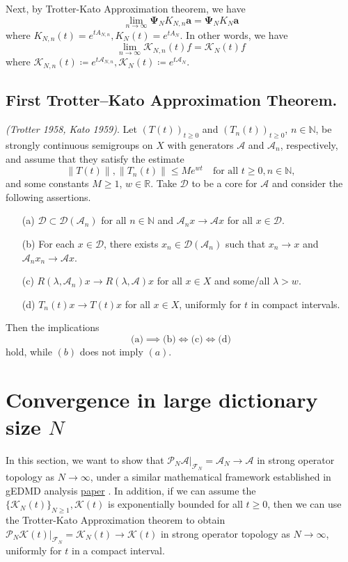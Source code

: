 \documentclass{article}[11]
\begin{document}
Next, by Trotter-Kato Approximation theorem, we have 
$$\lim_{n\to\infty} \mathbf{\Psi}_N K_{N,n} \mathbf{a} = \mathbf{\Psi}_N K_N \mathbf{a}$$ 
where $K_{N,n}(t) = e^{t A_{N,n}}, K_{N}(t) = e^{t A_N}$. In other words, we have
$$
\lim_{n\to\infty}\mathcal{K}_{N,n}(t) f = \mathcal{K}_{N}(t) f
$$ where $\mathcal{K}_{N,n}(t)\coloneqq e^{t \mathcal{A}_{N,n}}, \mathcal{K}_{N}(t)\coloneqq e^{t \mathcal{A}_N}$.

\subsection*{First Trotter--Kato Approximation Theorem.} 
\textit{(Trotter 1958, Kato 1959)}. Let $(T(t))_{t\geq0}$ and $(T_n(t))_{t\geq0}$, $n \in \mathbb{N}$, be strongly continuous semigroups on $X$ with generators $\mathcal{A}$ and $\mathcal{A}_n$, respectively, and assume that they satisfy the estimate
\[
\|T(t)\|, \|T_n(t)\| \leq Me^{wt} \quad \text{for all } t \geq 0, n \in \mathbb{N},
\]
and some constants $M \geq 1$, $w \in \mathbb{R}$. Take $\mathcal{D}$ to be a core for $\mathcal{A}$ and consider the following assertions.
\begin{itemize}
		\item[(a)] $\mathcal{D} \subset \mathcal{D}(\mathcal{A}_n)$ for all $n \in \mathbb{N}$ and $\mathcal{A}_n x \to \mathcal{A} x$ for all $x \in \mathcal{D}$.
		\item[(b)] For each $x \in \mathcal{D}$, there exists $x_n \in \mathcal{D}(\mathcal{A}_n)$ such that $x_n \to x$ and $\mathcal{A}_n x_n \to \mathcal{A} x$.
		\item[(c)] $R(\lambda, \mathcal{A}_n)x \to R(\lambda, \mathcal{A})x$ for all $x \in X$ and some/all $\lambda > w$.
		\item[(d)] $T_n(t)x \to T(t)x$ for all $x \in X$, uniformly for $t$ in compact intervals.
	\end{itemize}
Then the implications
\[
\text{(a)} \implies \text{(b)} \iff \text{(c)} \iff \text{(d)}
\]
hold, while $(b)$ does not imply $(a)$.





\newpage
\section{Convergence in large dictionary size $N$}
In this section, we want to show that $\mathcal{P}_N\mathcal{A}|_{\mathcal{F}_N} = \mathcal{A}_N \to \mathcal{A}$ in strong operator topology as $N \to \infty$, under a similar mathematical framework established in gEDMD analysis \href{https://arxiv.org/abs/2405.00539}{paper} . In addition, if we can assume the $\{\mathcal{K}_{N}(t)\}_{N\geq 1}, \mathcal{K}(t)$ is exponentially bounded for all $t\geq 0$, then we can use the Trotter-Kato Approximation theorem to obtain $\mathcal{P}_N\mathcal{K}(t)|_{\mathcal{F}_N} = \mathcal{K}_{N}(t) \to \mathcal{K}(t)$ in strong operator topology as $N \to \infty$, uniformly for $t$ in a compact interval.
\end{document}
